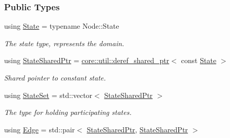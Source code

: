 \subsubsection*{Public Types}
\begin{DoxyCompactItemize}
\item 
using \hyperlink{structslb_1_1ext_1_1event_1_1UniformChange_ab06eed9d60ebe5b1a067319a52906351}{State} = typename Node\+::\+State\hypertarget{structslb_1_1ext_1_1event_1_1UniformChange_ab06eed9d60ebe5b1a067319a52906351}{}\label{structslb_1_1ext_1_1event_1_1UniformChange_ab06eed9d60ebe5b1a067319a52906351}

\begin{DoxyCompactList}\small\item\em The state type, represents the domain. \end{DoxyCompactList}\item 
using \hyperlink{structslb_1_1ext_1_1event_1_1UniformChange_a2e6e9605dcd4df428c03c7637fd0d20d}{State\+Shared\+Ptr} = \hyperlink{classslb_1_1core_1_1util_1_1deref__shared__ptr}{core\+::util\+::deref\+\_\+shared\+\_\+ptr}$<$ const \hyperlink{structslb_1_1ext_1_1event_1_1UniformChange_ab06eed9d60ebe5b1a067319a52906351}{State} $>$\hypertarget{structslb_1_1ext_1_1event_1_1UniformChange_a2e6e9605dcd4df428c03c7637fd0d20d}{}\label{structslb_1_1ext_1_1event_1_1UniformChange_a2e6e9605dcd4df428c03c7637fd0d20d}

\begin{DoxyCompactList}\small\item\em Shared pointer to constant state. \end{DoxyCompactList}\item 
using \hyperlink{structslb_1_1ext_1_1event_1_1UniformChange_a2c45514041ea86f77bbd0147fe06babd}{State\+Set} = std\+::vector$<$ \hyperlink{structslb_1_1ext_1_1event_1_1UniformChange_a2e6e9605dcd4df428c03c7637fd0d20d}{State\+Shared\+Ptr} $>$\hypertarget{structslb_1_1ext_1_1event_1_1UniformChange_a2c45514041ea86f77bbd0147fe06babd}{}\label{structslb_1_1ext_1_1event_1_1UniformChange_a2c45514041ea86f77bbd0147fe06babd}

\begin{DoxyCompactList}\small\item\em The type for holding participating states. \end{DoxyCompactList}\item 
using \hyperlink{structslb_1_1ext_1_1event_1_1UniformChange_a7ea26ff1c10c84d9bd6002bf5f175f22}{Edge} = std\+::pair$<$ \hyperlink{structslb_1_1ext_1_1event_1_1UniformChange_a2e6e9605dcd4df428c03c7637fd0d20d}{State\+Shared\+Ptr}, \hyperlink{structslb_1_1ext_1_1event_1_1UniformChange_a2e6e9605dcd4df428c03c7637fd0d20d}{State\+Shared\+Ptr} $>$\hypertarget{structslb_1_1ext_1_1event_1_1UniformChange_a7ea26ff1c10c84d9bd6002bf5f175f22}{}\label{structslb_1_1ext_1_1event_1_1UniformChange_a7ea26ff1c10c84d9bd6002bf5f175f22}


\end{DoxyCompactItemize}
